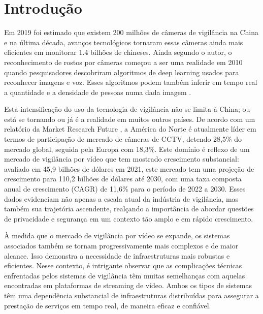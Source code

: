 \documentclass[12pt, %
openright, 
oneside, %
a4paper,    %
brazil]{facom-ufu-abntex2}
\begin{document}
\tableofcontents*
\cleardoublepage

\textual


\chapter[Introdução]{Introdução}
Em 2019 foi estimado que existem 200 milhões de câmeras de vigilância na China
e na última década, avanços tecnológicos tornaram essas câmeras ainda mais
eficientes em monitorar 1.4 bilhões de chineses. Ainda segundo o autor, o
reconhecimento de rostos por câmeras começou a ser uma realidade em 2010 quando
pesquisadores descobriram algoritmos de deep learning usados para reconhecer
imagens e voz. Esses algoritmos podem também inferir em tempo real a quantidade
e a densidade de pessoas numa dada imagem \cite{qiang2019road}.

Esta intensificação do uso da tecnologia de vigilância não se limita à China;
ou está se tornando ou já é a realidade em muitos outros países. De acordo com
um relatório da Market Research Future \cite{Gupta2018}, a América do Norte é
atualmente líder em termos de participação de mercado de câmeras de CCTV,
detendo 28,5\% do mercado global, seguida pela Europa com 18,3\%. Este domínio
é reflexo de um mercado de vigilância por vídeo que tem mostrado crescimento
substancial: avaliado em 45,9 bilhões de dólares em 2021, este mercado tem uma
projeção de crescimento para 110,2 bilhões de dólares até 2030, com uma taxa
composta anual de crescimento (CAGR) de 11,6\% para o período de 2022 a 2030.
Esses dados evidenciam não apenas a escala atual da indústria de vigilância,
mas também sua trajetória ascendente, realçando a importância de abordar
questões de privacidade e segurança em um contexto tão amplo e em rápido
crescimento.

À medida que o mercado de vigilância por vídeo se expande,
os sistemas associados também se tornam progressivamente mais complexos e de maior alcance.
Isso demonstra a necessidade de infraestruturas mais robustas e eficientes.
Nesse contexto, é intrigante observar que as complicações técnicas enfrentadas pelos
sistemas de vigilância têm muitas semelhanças com aquelas encontradas em plataformas de
streaming de vídeo. Ambos os tipos de
sistemas têm uma dependência substancial de infraestruturas distribuídas para
assegurar a prestação de serviços em tempo real, de maneira eficaz e confiável.
\end{document}
